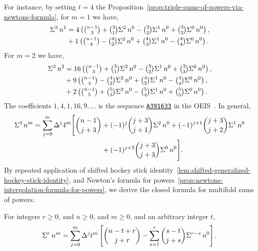 For instance, by setting $t=4$ the
Proposition~\eqref{prop:triple-sums-of-powers-via-newtons-formula},
for $m=1$ we have,
\begin{align*}
  \Sigma^{3}\,{n}^{1}
  &= 4 \left(
    \tbinom{n-1}{3}
    + \tbinom{3}{1} \Sigma^{2}\,{n}^{0}
    - \tbinom{3}{2} \Sigma^{1}\,{n}^{0}
    + \tbinom{3}{3} \Sigma^{0}\,{n}^{0}
  \right), \\
  &+ 1 \left(
    \tbinom{n-1}{4}
    - \tbinom{4}{2} \Sigma^{2}\,{n}^{0}
    + \tbinom{4}{3} \Sigma^{1}\,{n}^{0}
  - \tbinom{4}{4} \Sigma^{0}\,{n}^{0} \right).
\end{align*}
For $m=2$ we have,
\begin{align*}
  \Sigma^{3}\,{n}^{2}
  &= 16
  \left(
    \tbinom{n-1}{3}
    + \tbinom{3}{1} \Sigma^{2}\,{n}^{0}
    - \tbinom{3}{2} \Sigma^{1}\,{n}^{0}
  + \tbinom{3}{3} \Sigma^{0}\,{n}^{0} \right), \\
  &+ 9
  \left(
    \tbinom{n-1}{4}
    - \tbinom{4}{2} \Sigma^{2}\,{n}^{0}
    + \tbinom{4}{3} \Sigma^{1}\,{n}^{0}
    - \tbinom{4}{4} \Sigma^{0}\,{n}^{0}
  \right), \\
  &+ 2
  \left( \tbinom{n-1}{5}
    + \tbinom{5}{3} \Sigma^{2}\,{n}^{0}
    - \tbinom{5}{4} \Sigma^{1}\,{n}^{0}
  + \tbinom{5}{5} \Sigma^{0}\,{n}^{0} \right).
\end{align*}
The coefficients $1,4,1,16,9,\dots$ is the sequence
\href{https://oeis.org/A391633}{\texttt{A391633}}
in the OEIS~\cite{sloane2003line}.
In general,
\begin{align*}
  \Sigma^{3}\,{n}^{m}
  = \sum_{j=0}^{m} \Delta^{j} 4^m
  \Bigg[
    \binom{n-1}{j+3}
    &+ (-1)^{j} \binom{j+3}{j+1} \Sigma^{2}\,{n}^{0}
    + (-1)^{j+1} \binom{j+3}{j+2} \Sigma^{1}\,{n}^{0} \\
    &+ (-1)^{j+2} \binom{j+3}{j+3} \Sigma^{0}\,{n}^{0}
  \Bigg].
\end{align*}
By repeated application of shifted hockey stick
identity~\eqref{lem:shifted-generalized-hockey-stick-identity},
and Newton's formula for
powers~\eqref{prop:newtons-interpolation-formula-for-powers},
we derive the closed formula for multifold sums of powers.

\begin{theorem}
  \label{theorem:multifold-sums-of-powers-via-newtons-formula}
  For integers $r\geq 0$, and $n\geq 0$, and $m\geq 0$,
  and an arbitrary integer $t$,
  \begin{align*}
    \Sigma^{r}\,{n}^{m}
    = \sum_{j=0}^{m} \Delta^{j} t^{m}
    \left[
      \binom{n-t+r}{j+r}
      - \sum_{s=1}^{r} \binom{s-t}{j+s} \Sigma^{r-s}\,{n}^{0}
    \right].
  \end{align*}
\end{theorem}

